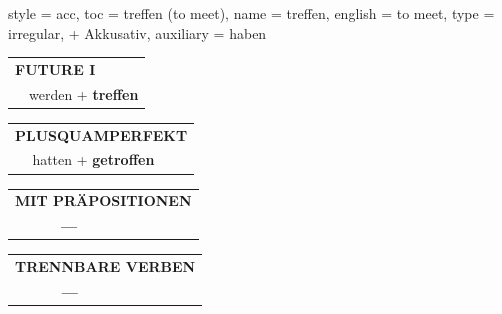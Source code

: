 \begin{verbentry}{
  style = {acc},
  toc = {treffen (to meet)},
  name = {treffen},
  english = {to meet},
  type = {irregular, + Akkusativ},
  auxiliary = {haben}
}
\begin{tabular}{rl}
    \multicolumn{2}{l}{\textbf{FUTURE I} }\\
  &  werden + \textbf{treffen}\\
 
  \end{tabular}
\hfill
   \begin{tabular}{rl}
      \multicolumn{2}{l}{\textbf{PLUSQUAMPERFEKT}}\\
   & hatten + \textbf{getroffen}\\
  \end{tabular}
  
  
\vspace{10pt}

\begin{tabular}{lll}
\multicolumn{3}{l}{\textbf{MIT PRÄPOSITIONEN}}\\
& \textbf{---} & \\
\end{tabular}
\hfill
\begin{tabular}{lll}
\multicolumn{3}{l}{\textbf{TRENNBARE VERBEN}}\\
& \textbf{---} & \\
\end{tabular}
\vspace{-5pt}
\end{verbentry}

